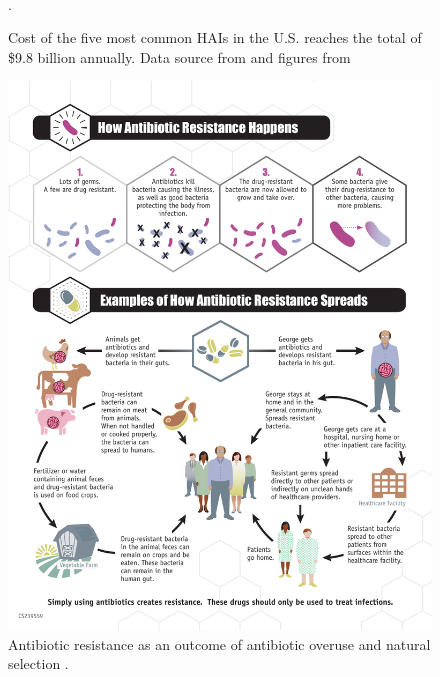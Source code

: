 \begin{figure}
	\centering
	~
	\caption{Cost of the five most common HAIs in the U.S. reaches the total of \$9.8 billion annually. Data source from \cite{zimlichman2013health} and figures from \cite{center}}.
	\label{money}
\end{figure}


\begin{figure}
	\centering
	\includegraphics[width=.7\textwidth]{./img/evol.pdf}
	\caption{Antibiotic resistance as an outcome of antibiotic overuse and natural selection \cite{resistance}.}
	\label{evol}
\end{figure}



